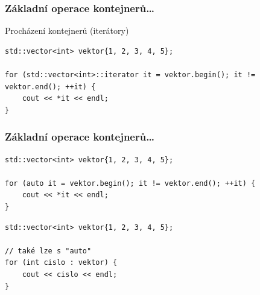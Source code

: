\begin{frame}[fragile]
\frametitle{Základní operace kontejnerů\ldots}

\begin{block}{Procházení kontejnerů (iterátory)}
\end{block}

\begin{yesblock}
\begin{lstlisting}
std::vector<int> vektor{1, 2, 3, 4, 5};

for (std::vector<int>::iterator it = vektor.begin(); it != vektor.end(); ++it) {
	cout << *it << endl;
}
\end{lstlisting}
\end{yesblock}
\end{frame}



\begin{frame}[fragile]
\frametitle{Základní operace kontejnerů\ldots}
\begin{yesblock}
\begin{lstlisting}
std::vector<int> vektor{1, 2, 3, 4, 5};

for (auto it = vektor.begin(); it != vektor.end(); ++it) {
	cout << *it << endl;
}
\end{lstlisting}
\end{yesblock}

\begin{yesblock}
\begin{lstlisting}
std::vector<int> vektor{1, 2, 3, 4, 5};

// také lze s "auto"
for (int cislo : vektor) {
	cout << cislo << endl;
}
\end{lstlisting}
\end{yesblock}
\end{frame}







